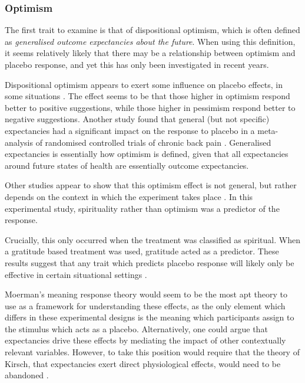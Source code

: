 \subsubsection{Optimism}
\label{sec:optimism}

The first trait to examine is that of dispositional optimism, which is often defined as \textit{generalised outcome expectancies about the future}. When using this definition, it seems relatively likely that there may be a relationship between optimism and placebo response, and yet this has only been investigated in recent years. 

Dispositional optimism appears to exert some influence on placebo effects, in some situations \cite{Geers2005,morton2009reproducibility}. The effect seems to be that those higher in optimism respond better to positive suggestions, while those higher in pessimism respond better to negative suggestions. Another study found that general (but not specific) expectancies had a significant impact on the response to placebo in a meta-analysis of randomised controlled trials of chronic back pain \cite{myers2008patient}. Generalised expectancies is essentially how optimism is defined, given that all expectancies around future states of health are essentially outcome expectancies. 

Other studies appear to  show that this optimism effect is not general, but rather depends on the context in which the experiment takes place \cite{Hyland2006}. In this experimental study, spirituality rather than optimism was a predictor of the response.  

Crucially, this only occurred when the treatment was classified as spiritual. When a gratitude based treatment was used, gratitude acted as a predictor. These results suggest that any trait which predicts placebo response will likely only be effective in certain situational settings \cite{Kaptchuk2008a}. 

Moerman's meaning response theory would seem to be the most apt theory to use as a framework for understanding these effects, as the only element which differs in these experimental designs is the meaning which participants assign to the stimulus which acts as a placebo. Alternatively, one could argue that expectancies drive these effects by mediating the impact of other contextually relevant variables. However, to take this position would require that the theory of Kirsch, that expectancies exert direct physiological effects, would need to be abandoned \cite{Kirsch1985}.  

